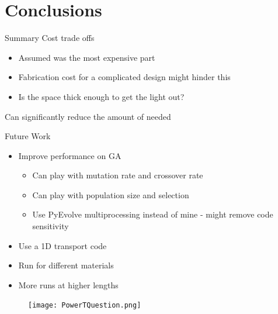 \documentclass[compress]{beamer}
\begin{document}
\section{Conclusions}
\begin{frame}{Summary}
Cost trade offs
\begin{itemize}
	\item Assumed  was the most expensive part
	\item Fabrication cost for a complicated design might hinder this
	\item Is the space thick enough to get the light out?
\end{itemize}
Can significantly reduce the amount of  needed
\end{frame}
\begin{frame}{Future Work}
\begin{itemize}
	\item Improve performance on GA
	\small
	\begin{itemize}
		\item Can play with mutation rate and crossover rate
		\item Can play with population size and selection
		\item Use PyEvolve multiprocessing instead of mine - might remove code sensitivity
	\end{itemize}
	\normalsize
	\item Use a 1D transport code
	\item Run for different materials
	\item More runs at higher lengths
\end{itemize}
\end{frame}
\begin{frame}{}
  \centering
  \begin{figure}
    \texttt{[image: PowerTQuestion.png]}
  \end{figure}
\end{frame}
%  
\end{document}
